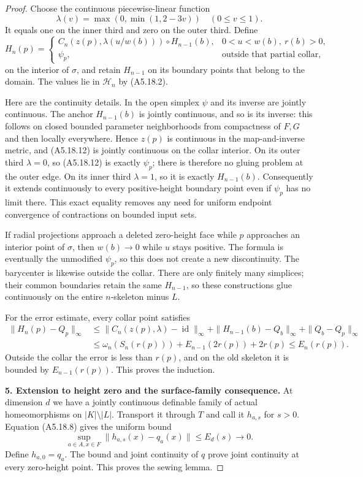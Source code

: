 \begin{proof}
Choose the continuous piecewise-linear function
\[
 \lambda(v)=\max(0,\min(1,2-3v))\quad(0\le v\le1).
\]
It equals one on the inner third and zero on the outer third. Define
\[
 H_n(p)=
 \begin{cases}
 C_n(z(p),\lambda(u/w(b)))\circ H_{n-1}(b),
       &0<u<w(b),\ r(b)>0,\\
 \psi_p,&\text{outside that partial collar},
 \end{cases}
 \tag{A5.18.12}
\]
on the interior of $\sigma$, and retain $H_{n-1}$ on its boundary points
that belong to the domain. The values lie in $\mathcal H_n$ by (A5.18.2).

Here are the continuity details. In the open simplex $\psi$ and its inverse
are jointly continuous. The anchor $H_{n-1}(b)$ is jointly continuous, and
so is its inverse: this follows on closed bounded parameter neighborhoods
from compactness of $F,G$ and then locally everywhere. Hence $z(p)$ is
continuous in the map-and-inverse metric, and (A5.18.12) is jointly continuous
on the collar interior. On its outer third $\lambda=0$, so (A5.18.12) is
exactly $\psi_p$; there is therefore no gluing problem at the outer edge.
On its inner third $\lambda=1$, so it is exactly $H_{n-1}(b)$. Consequently
it extends continuously to every positive-height boundary point even if
$\psi_p$ has no limit there. This exact equality removes any need for
uniform endpoint convergence of contractions on bounded input sets.

If radial projections approach a deleted zero-height face while $p$
approaches an interior point of $\sigma$, then $w(b)\to0$ while $u$ stays
positive. The formula is eventually the unmodified $\psi_p$, so this does
not create a new discontinuity. The barycenter is likewise outside the
collar. There are only finitely many simplices; their common boundaries
retain the same $H_{n-1}$, so these constructions glue continuously on
the entire $n$-skeleton minus $L$.

For the error estimate, every collar point satisfies
\[
\begin{split}
 \|H_n(p)-Q_p\|_\infty
 &\le \|C_n(z(p),\lambda)-\operatorname{id}\|_\infty
       +\|H_{n-1}(b)-Q_b\|_\infty+\|Q_b-Q_p\|_\infty\\
 &\le\omega_n(S_n(r(p)))+E_{n-1}(2r(p))+2r(p)
 \le E_n(r(p)).
\end{split}
\]
Outside the collar the error is less than $r(p)$, and on the old skeleton
it is bounded by $E_{n-1}(r(p))$. This proves the induction.

\textbf{5. Extension to height zero and the surface-family consequence.}\quad
At dimension $d$ we have a jointly continuous definable family of actual
homeomorphisms on $|K|\setminus|L|$. Transport it through $T$ and call it
$h_{a,s}$ for $s>0$. Equation (A5.18.8) gives the uniform bound
\[
 \sup_{a\in A,x\in F}\|h_{a,s}(x)-q_a(x)\|\le E_d(s)\longrightarrow0.
\]
Define $h_{a,0}=q_a$. The bound and joint continuity of $q$ prove joint
continuity at every zero-height point. This proves the sewing lemma.


\end{proof}
